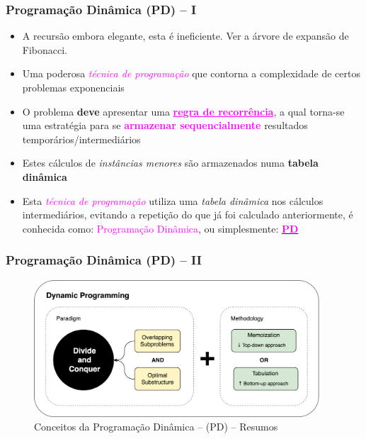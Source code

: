 \begin{frame}[fragile]

    \frametitle{Programação Dinâmica (PD) -- I}

   \begin{block}{}
     \begin{itemize}
     \item A recursão embora elegante, esta é ineficiente. Ver a árvore de expansão de Fibonacci.
     
     \pause
      \item Uma poderosa \textcolor{magenta}{\textit{técnica de programação}}  que  contorna a complexidade de certos problemas
      exponenciais
      
       \pause
       \item O problema \textbf{deve} apresentar uma \textcolor{magenta}{\textbf{\underline{regra de recorrência}}}, a qual
       torna-se uma estratégia para se \textcolor{magenta}{\textbf{armazenar sequencialmente}} resultados temporários/intermediários
              
      \pause
      \item Estes cálculos de \textit{instâncias menores} são armazenados numa \textbf{tabela dinâmica}
            
      \pause
      \item Esta \textcolor{magenta}{\textit{técnica de programação}} 
      utiliza uma \textit{tabela dinâmica} nos cálculos intermediários,
      evitando a repetição do que já foi calculado anteriormente, é conhecida como:
      \textcolor{magenta}{Programação Dinâmica}, ou simplesmente:
       \underline{\textcolor{magenta}{\textbf{PD}}}

    \end{itemize}
    
    \end{block}
    
\end{frame}



\begin{frame}[fragile]
\frametitle{Programação Dinâmica (PD) -- II}

\begin{figure}[!htb]
\centering
\includegraphics[width=0.95\textwidth, height=0.70\textheight]{figures/ilustra_PD.png}
\caption{Conceitos da Programação Dinâmica -- (PD) -- Resumos}
\end{figure}
\end{frame}


